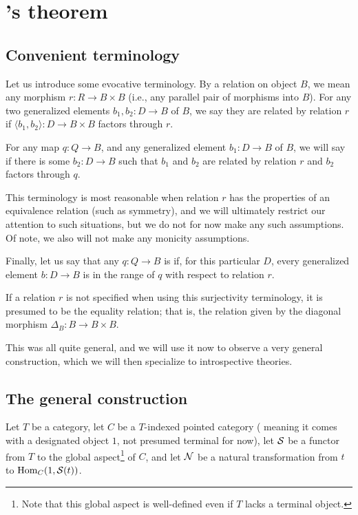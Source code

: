 \section{\Loeb's theorem}

\subsection{Convenient terminology}
Let us introduce some evocative terminology. By a relation on object $B$, we mean any morphism $r : R \to B \times B$ (i.e., any parallel pair of morphisms into $B$). For any two generalized elements $b_1, b_2 : D \to B$ of $B$, we say they are related by relation $r$ if $\langle b_1, b_2 \rangle : D \to B \times B$ factors through $r$.

For any map $q: Q \to B$, and any generalized element $b_1 : D \to B$ of $B$, we will say  if there is some $b_2 : D \to B$ such that $b_1$ and $b_2$ are related by relation $r$ and $b_2$ factors through $q$.

This terminology is most reasonable when relation $r$ has the properties of an equivalence relation (such as symmetry), and we will ultimately restrict our attention to such situations, but we do not for now make any such assumptions. Of note, we also will not make any monicity assumptions.

Finally, let us say that any $q : Q \to B$ is  if, for this particular $D$, every generalized element $b : D \to B$ is in the range of $q$ with respect to relation $r$.

If a relation $r$ is not specified when using this surjectivity terminology, it is presumed to be the equality relation; that is, the relation given by the diagonal morphism $\Delta_B : B \to B \times B$.

This was all quite general, and we will use it now to observe a very general construction, which we will then specialize to introspective theories.

\subsection{The general construction}
\label{GeneralDiag}
Let $T$ be a category, let $C$ be a $T$-indexed pointed category ( meaning it comes with a designated object $1$, not presumed terminal for now), let $\mathcal{S}$ be a functor from $T$ to the global aspect\footnote{Note that this global aspect is well-defined even if $T$ lacks a terminal object.} of $C$, and let $\mathcal{N}$ be a natural transformation from $t$ to $\operatorname{Hom}_C(1, \mathcal{S}(t))$.


